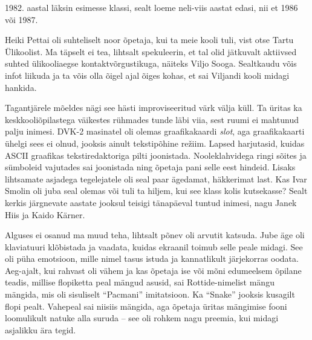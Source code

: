 1982. aastal läksin esimesse klassi, 
sealt loeme neli-viis aastat edasi, nii et 1986 või 1987. 


Heiki Pettai oli suhteliselt noor õpetaja, kui ta 
meie kooli tuli, vist otse Tartu Ülikoolist. Ma täpselt ei tea, lihtsalt 
spekuleerin, et tal olid jätkuvalt aktiivsed suhted ülikooliaegse 
kontaktvõrgustikuga, näiteks Viljo Sooga. Sealtkaudu võis infot liikuda ja ta 
võis olla õigel ajal õiges kohas, et sai Viljandi kooli midagi hankida. 


Tagantjärele mõeldes nägi see hästi improviseeritud värk välja küll. 
Ta üritas ka keskkooliõpilastega väikestes rühmades tunde
läbi viia, sest ruumi ei mahtunud 
palju inimesi. DVK-2 masinatel oli olemas graafikakaardi \emph{slot}, 
aga graafikakaarti ühelgi sees ei olnud, jooksis ainult 
tekstipõhine režiim. Lapsed harjutasid, kuidas 
ASCII graafikas tekstiredaktoriga pilti joonistada. Nooleklahvidega ringi
sõites ja sümboleid vajutades sai joonistada 
ning õpetaja pani selle eest hindeid. Lisaks
lihtsamate asjadega tegelejatele oli seal
paar ägedamat, häkkerimat last. Kas Ivar Smolin oli juba seal olemas või tuli ta hiljem, kui see klass kolis
kutsekasse? Sealt kerkis järgnevate aastate jooksul teisigi tänapäeval tuntud inimesi, 
nagu Janek Hiis ja Kaido 
Kärner.


Alguses ei osanud ma muud teha, lihtsalt põnev oli arvutit 
katsuda. Jube äge oli klaviatuuri klõbistada ja vaadata, kuidas ekraanil toimub selle 
peale midagi. See oli püha emotsioon, mille nimel 
tasus istuda ja kannatlikult järjekorras oodata. Aeg-ajalt, kui rahvast oli vähem ja kas õpetaja ise või mõni 
edumeelsem õpilane teadis, millise flopiketta peal mängud asusid, 
sai Rottide-nimelist mängu mängida, mis oli sisuliselt 
\enquote{Pacmani} imitatsioon. Ka \enquote{Snake} jooksis 
kusagilt flopi pealt. Vahepeal sai niisiis mängida, aga õpetaja üritas 
mängimise fooni loomulikult natuke alla suruda -- see oli rohkem nagu 
preemia, kui midagi asjalikku ära tegid. 

